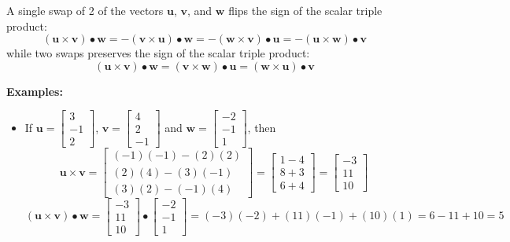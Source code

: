 \documentclass{article}
\begin{document}
A single swap of 2 of the vectors \(\mathbf{u}\), \(\mathbf{v}\), and \(\mathbf{w}\) flips the sign of the scalar triple product:
\[(\mathbf{u} \times \mathbf{v}) \bullet \mathbf{w} = -(\mathbf{v} \times \mathbf{u}) \bullet \mathbf{w} = -(\mathbf{w} \times \mathbf{v}) \bullet \mathbf{u} = -(\mathbf{u} \times \mathbf{w}) \bullet \mathbf{v}\] 
while two swaps preserves the sign of the scalar triple product:
\[(\mathbf{u} \times \mathbf{v}) \bullet \mathbf{w} = (\mathbf{v} \times \mathbf{w}) \bullet \mathbf{u} = (\mathbf{w} \times \mathbf{u}) \bullet \mathbf{v}\]


\textbf{Examples:}
\begin{itemize}
\item If \(\mathbf{u} = \begin{bmatrix} 3 \\ -1 \\ 2 \end{bmatrix}\), \(\mathbf{v} = \begin{bmatrix} 4 \\ 2 \\ -1 \end{bmatrix}\) and \(\mathbf{w} = \begin{bmatrix} -2 \\ -1 \\ 1 \end{bmatrix}\), then
\[\mathbf{u} \times \mathbf{v} = \begin{bmatrix} (-1)(-1) - (2)(2) \\ (2)(4) - (3)(-1) \\ (3)(2) - (-1)(4) \end{bmatrix} = \begin{bmatrix} 1 - 4 \\ 8 + 3 \\ 6 + 4 \end{bmatrix} = \begin{bmatrix} -3 \\ 11 \\ 10 \end{bmatrix}\]
\[(\mathbf{u} \times \mathbf{v}) \bullet \mathbf{w} = \begin{bmatrix} -3 \\ 11 \\ 10 \end{bmatrix} \bullet \begin{bmatrix} -2 \\ -1 \\ 1 \end{bmatrix} = (-3)(-2) + (11)(-1) + (10)(1) = 6 - 11 + 10 = 5\]

\end{itemize}
\end{document}
